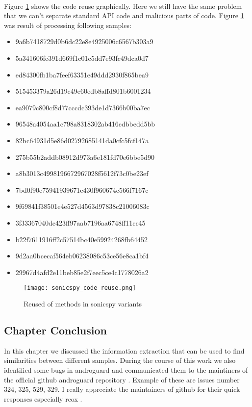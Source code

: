 \documentclass[../main.tex]{subfile}
\begin{document}
		\paragraph{} Figure \ref{fig:sonicspy_graph} shows the code reuse graphically. Here we still have the same problem that we can't separate standard API code and malicious parts of code. Figure \ref{fig:sonicspy_graph} was result of processing following samples:
		\begin{itemize}
			\item 9a6b7418729d0b6dc22e8e4925006c6567b303a9
			\item 5a341606fc391d669f1c01c5dd7e93fc49dca0d7
			\item ed84300fb1ba7feef63351e49ddd2930f865bea9
			\item 515453379a26d19c49e60edb8affd801b6001234
			\item ea9079c800cf8d77cccdc393de1d7366b00ba7ec
			\item 96548a4054aa1c798a8318302ab416cdbbedd5bb
			\item 82bc64931d5e86d02792685141da0cfc5fcf147a
			\item 275b55b2addb08912d973a6e181fd70e6bbe5d90
			\item a8b3013c4998196672967028f5612f73c0be23ef
			\item 7bd0f90e75941939671e430f960674c566f7167c
			\item 9f69841f38501e4e527d4563d97838c21006083c
			\item 3f33367040dc423ff97aab7196aa6748ff11cc45
			\item b22f7611916ff2c57514bc40e59924268fb64452
			\item 9d2aa0bcecaf564eb06238086c53ce56e8ca1bf4
			\item 29967d4afd2e11beb85e2f7eec5ce4c1778026a2
		\end{itemize}
		
		\begin{figure}
			\texttt{[image: sonicspy\_code\_reuse.png]}
			\caption{Reused of methods in sonicspy variants}
			\label{fig:sonicspy_graph}			
		\end{figure}
		
		
		\subsection{Chapter Conclusion} In this chapter we discussed the information extraction that can be used to find similarities between different samples. During the course of this work we also identified some bugs in androguard and communicated them to the maintiners of the official github androguard repository \cite{desnos2017androguard}. Example of these are issues number 324, 325, 529, 329. I really appreciate the maintainers of github for their quick responses especially reox \cite{reox}.
\end{document}

